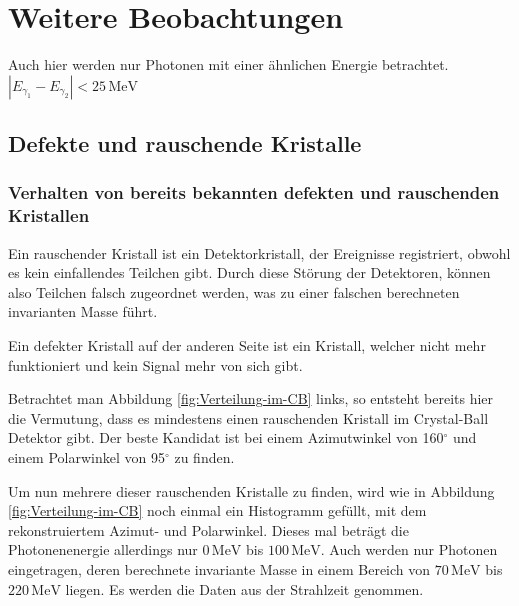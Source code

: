 \documentclass[a4paper,11pt,oneside,final,german,openbib,pdftex]{scrbook}
\begin{document}
{\chapter{Weitere Beobachtungen}
\label{sec:Weitere-Beobachtungen}

Auch hier werden nur Photonen mit einer \"ahnlichen Energie betrachtet. $|E_{\gamma_1}-E_{\gamma_2}|<25\,\text{MeV}$


\section{Defekte und rauschende Kristalle}


\subsection{Verhalten von bereits bekannten defekten und rauschenden Kristallen}
\label{sec:Bekannte-Dead-Crystals}
Ein rauschender Kristall ist ein Detektorkristall, der Ereignisse registriert, obwohl es kein einfallendes Teilchen gibt. Durch diese St\"orung der Detektoren, k\"onnen also Teilchen falsch zugeordnet werden, was zu einer falschen berechneten invarianten Masse f\"uhrt. 

Ein defekter Kristall auf der anderen Seite ist ein Kristall, welcher nicht mehr funktioniert und kein Signal mehr von sich gibt.

Betrachtet man Abbildung \ref{fig:Verteilung-im-CB} links, so entsteht bereits hier die Vermutung, dass es mindestens einen rauschenden Kristall im Crystal-Ball Detektor gibt. Der beste Kandidat ist bei einem Azimutwinkel von 160$^{\circ}$ und einem Polarwinkel von 95$^{\circ}$ zu finden.

Um nun mehrere dieser rauschenden Kristalle zu finden, wird wie in Abbildung \ref{fig:Verteilung-im-CB} noch einmal ein Histogramm gef\"ullt, mit dem rekonstruiertem Azimut- und Polarwinkel. Dieses mal betr\"agt die Photonenenergie allerdings nur $0\,\text{MeV}$ bis $100\,\text{MeV}$. Auch werden nur Photonen eingetragen, deren berechnete invariante Masse in einem Bereich von $70\,\text{MeV}$ bis $220\, \text{MeV}$ liegen. Es werden die Daten aus der Strahlzeit genommen.

}
\end{document}
